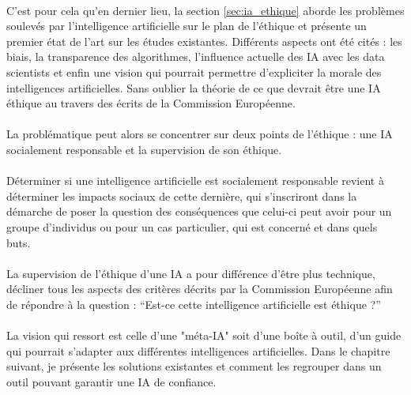 \documentclass[10pt, french, a4paper]{report}
\begin{document}
\paragraph{}
C’est pour cela qu’en dernier lieu, la section \ref{sec:ia_ethique} aborde les problèmes soulevés par l’intelligence artificielle sur le plan de l’éthique et présente un premier état de l’art sur les études existantes. Différents aspects ont été cités : les biais, la transparence des algorithmes, l’influence actuelle des IA avec les data scientists et enfin une vision qui pourrait permettre d’expliciter la morale des intelligences artificielles. Sans oublier la théorie de ce que devrait être une IA éthique au travers des écrits de la Commission Européenne.

\paragraph{}
La problématique peut alors se concentrer sur deux points de l’éthique : une IA socialement responsable et la supervision de son éthique.

\paragraph{}
Déterminer si une intelligence artificielle est socialement responsable revient à déterminer les impacts sociaux de cette dernière, qui s’inscriront dans la démarche de poser la question des conséquences que celui-ci peut avoir pour un groupe d’individus ou pour un cas particulier, qui est concerné et dans quels buts.

\paragraph{}
La supervision de l'éthique d'une IA a pour différence d'être plus technique, décliner tous les aspects des critères décrits par la Commission Européenne afin de répondre à la question : ``Est-ce cette intelligence artificielle est éthique ?''

\paragraph{}
La vision qui ressort est celle d’une "méta-IA" soit d’une boîte à outil, d’un guide qui pourrait s’adapter aux différentes intelligences artificielles. Dans le chapitre suivant, je présente les solutions existantes et comment les regrouper dans un outil pouvant garantir une IA de confiance.
\end{document}
